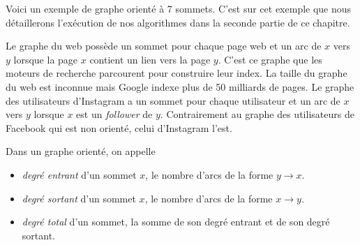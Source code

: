 \documentclass{magnolia}
\begin{document}
\begin{exemples}
\exemple Voici un exemple de graphe orienté à 7 sommets. C'est sur cet exemple que nous
  détaillerons l'exécution de nos algorithmes dans la seconde partie de ce chapitre.
\begin{center}
\end{center}
\exemple Le graphe du web possède un sommet pour chaque page web et un arc de $x$ vers $y$
  lorsque la page $x$ contient un lien vers la page $y$. C'est ce graphe que les moteurs
  de recherche parcourent pour construire leur index. La taille du graphe du web est inconnue
  mais Google indexe plus de 50 milliards de pages.
\exemple Le graphe des utilisateurs d'Instagram a un sommet pour chaque utilisateur
  et un arc de $x$ vers $y$ lorsque $x$ est un \emph{follower} de $y$. Contrairement
  au graphe des utilisateurs de Facebook qui est non orienté, celui
  d'Instagram l'est.
\end{exemples}

\begin{definition}
Dans un graphe orienté, on appelle
\begin{itemize}
\item \emph{degré entrant} d'un sommet $x$, le nombre d'arcs de la forme $y\to x$.
\item \emph{degré sortant} d'un sommet $x$, le nombre d'arcs de la forme $x\to y$.
\item \emph{degré total} d'un sommet, la somme de son degré entrant et de son degré sortant.
\end{itemize}
\end{definition}
\end{document}
